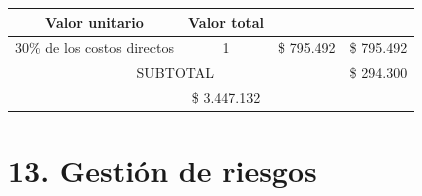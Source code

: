 \documentclass[
11pt, %
codirector, %
]{charter}
\begin{document}
\begin{table}[htpb]
\begin{tabularx}{\linewidth}{@{}|X|c|r|r|@{}}
		\multicolumn{1}{c|}{\cellcolor[HTML]{C0C0C0}Valor unitario} &
		\multicolumn{1}{c|}{\cellcolor[HTML]{C0C0C0}Valor total}        \\ \hline
		\multicolumn{1}{|l|}{30\% de los costos directos}           &
		\multicolumn{1}{c|}{1}                                      &
		\multicolumn{1}{c|}{\$ 795.492}                             &
		\multicolumn{1}{c|}{\$ 795.492}                                 \\ \hline
		\multicolumn{3}{|c|}{SUBTOTAL}                              &
		\multicolumn{1}{c|}{\$ 294.300}                                 \\ \hline
		\rowcolor[HTML]{C0C0C0}
		\multicolumn{3}{|c|}{TOTAL}                                 &
		\multicolumn{1}{c|}{\$ 3.447.132}                               \\ \hline
	\end{tabularx}%
\end{table}


\section{13. Gestión de riesgos}
\label{sec:riesgos}
\end{document}
